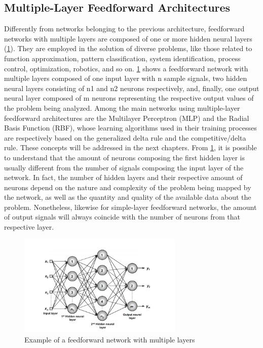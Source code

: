 \subsection{Multiple-Layer Feedforward Architectures}
Differently from networks belonging to the previous architecture, feedforward
networks with multiple layers are composed of one or more hidden neural layers
(\ref{fig:ann2}). They are employed in the solution of diverse problems, like those related
to function approximation, pattern classification, system identification, process
control, optimization, robotics, and so on.
\ref{fig:ann2} shows a feedforward network with multiple layers composed of one
input layer with n sample signals, two hidden neural layers consisting of n1 and n2
neurons respectively, and, finally, one output neural layer composed of m neurons
representing the respective output values of the problem being analyzed.
Among the main networks using multiple-layer feedforward architectures are the
Multilayer Perceptron (MLP) and the Radial Basis Function (RBF), whose learning
algorithms used in their training processes are respectively based on the generalized
delta rule and the competitive/delta rule. These concepts will be addressed in the
next chapters.
From \ref{fig:ann2}, it is possible to understand that the amount of neurons composing
the first hidden layer is usually different from the number of signals composing the
input layer of the network. In fact, the number of hidden layers and their respective
amount of neurons depend on the nature and complexity of the problem being
mapped by the network, as well as the quantity and quality of the available data
about the problem. Nonetheless, likewise for simple-layer feedforward networks,
the amount of output signals will always coincide with the number of neurons from
that respective layer.

\begin{figure}[H]
\centering
\includegraphics[width=0.7\textwidth]{img/ann2.PNG}
\caption{  Example of a feedforward network with multiple layers }
\label{fig:ann2}
\end{figure}


